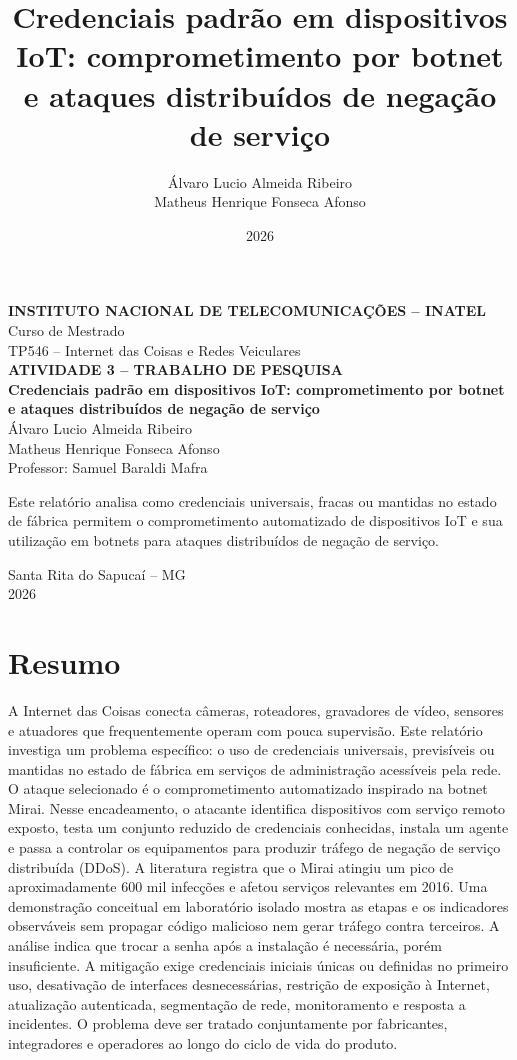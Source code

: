 \documentclass[11pt,a4paper]{article}
\title{\textbf{Credenciais padrão em dispositivos IoT: comprometimento por botnet e ataques distribuídos de negação de serviço}}
\author{Álvaro Lucio Almeida Ribeiro\\Matheus Henrique Fonseca Afonso}
\date{2026}
\begin{document}
\hypersetup{pageanchor=false}
\begin{titlepage}
\centering
\vspace*{1cm}
{\large \textbf{INSTITUTO NACIONAL DE TELECOMUNICAÇÕES -- INATEL}}\\[0.4cm]
{\large Curso de Mestrado}\\[0.4cm]
{\large TP546 -- Internet das Coisas e Redes Veiculares}\\[1.6cm]
{\large \textbf{ATIVIDADE 3 -- TRABALHO DE PESQUISA}}\\[1.4cm]
{\LARGE \textbf{Credenciais padrão em dispositivos IoT: comprometimento por botnet e ataques distribuídos de negação de serviço}}\\[1.5cm]
{\large Álvaro Lucio Almeida Ribeiro\\[0.2cm]Matheus Henrique Fonseca Afonso}\\[0.8cm]
{\large Professor: Samuel Baraldi Mafra}
\vfill
\begin{minipage}{0.82\textwidth}
\centering
Este relatório analisa como credenciais universais, fracas ou mantidas no estado de fábrica permitem o comprometimento automatizado de dispositivos IoT e sua utilização em botnets para ataques distribuídos de negação de serviço.
\end{minipage}
\vfill
{\large Santa Rita do Sapucaí -- MG\\2026}
\end{titlepage}

\hypersetup{pageanchor=true}
\twocolumn

\section*{Resumo}
A Internet das Coisas conecta câmeras, roteadores, gravadores de vídeo, sensores e atuadores que frequentemente operam com pouca supervisão. Este relatório investiga um problema específico: o uso de credenciais universais, previsíveis ou mantidas no estado de fábrica em serviços de administração acessíveis pela rede. O ataque selecionado é o comprometimento automatizado inspirado na botnet Mirai. Nesse encadeamento, o atacante identifica dispositivos com serviço remoto exposto, testa um conjunto reduzido de credenciais conhecidas, instala um agente e passa a controlar os equipamentos para produzir tráfego de negação de serviço distribuída (DDoS). A literatura registra que o Mirai atingiu um pico de aproximadamente 600 mil infecções e afetou serviços relevantes em 2016. Uma demonstração conceitual em laboratório isolado mostra as etapas e os indicadores observáveis sem propagar código malicioso nem gerar tráfego contra terceiros. A análise indica que trocar a senha após a instalação é necessária, porém insuficiente. A mitigação exige credenciais iniciais únicas ou definidas no primeiro uso, desativação de interfaces desnecessárias, restrição de exposição à Internet, atualização autenticada, segmentação de rede, monitoramento e resposta a incidentes. O problema deve ser tratado conjuntamente por fabricantes, integradores e operadores ao longo do ciclo de vida do produto.
\end{document}
